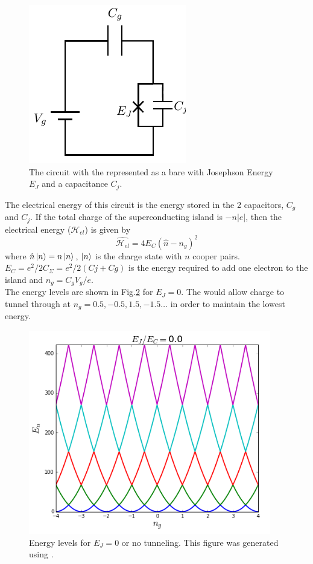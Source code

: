 \begin{figure}
\centering
\includegraphics{Figures/CPB}
\decoRule
\caption[\CPB circuit]{The \CPB circuit with the \JJ represented as a bare \JJ with Josephson Energy $E_J$ and a capacitance $C_j$.}
\label{fig:cooperpairbox}
\end{figure}

The electrical energy of this circuit is the energy stored in the 2 capacitors, $C_g$ and $C_j$. If the total charge of the superconducting island is $-n|e|$, then the electrical energy ($\mathcal{H}_{el}$) is given by \cite{Schuster2007}
\begin{equation}
\hat{\mathcal{H}_{el}}=4E_C(\hat{n}-n_g)^2
\end{equation}
where $\hat{n}\ket{n}=n\ket{n}$, $\ket{n}$ is the charge state with $n$ cooper pairs.\\
$E_C=e^2/2C_\Sigma=e^2/2(Cj+Cg)$ is the energy required to add one electron to the island and $n_g=C_gV_g/e$.\\
The energy levels are shown in Fig.\ref{fig:CPB EJ=0} for $E_J=0$. The \JJ would allow charge to tunnel through at $n_g=0.5,-0.5,1.5,-1.5\ldots$ in order to maintain the lowest energy.

\begin{figure}
\centering
\includegraphics[width=300pt]{Figures/EjEc=0.png}
\decoRule
\caption[Energy Level for $E_J=0$]{Energy levels for $E_J=0$ or no tunneling. This figure was generated using \cite{Johansson2012}.}
\label{fig:CPB EJ=0}
\end{figure}

